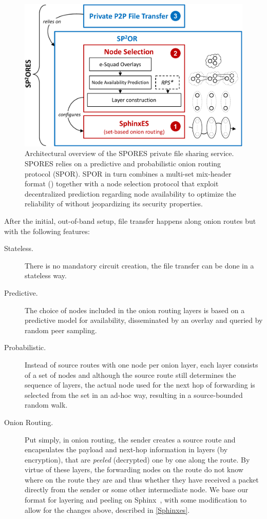 \begin{figure}[t]
  \centering
  \def\svgwidth{0.8\columnwidth}
    \includegraphics[width=\columnwidth]{figures/OverviewSPORES_cropped}
    \caption{Architectural overview of the \ac{SPORES} private file sharing service. \ac{SPORES} relies on a predictive and probabilistic onion routing protocol (\ac{SPOR}). \ac{SPOR} in turn combines a multi-set mix-header format (\Sphinxes) together with a node selection protocol that exploit decentralized prediction regarding node availability to optimize the reliability of \Sphinxes without jeopardizing its security properties.}
    \label{fig:outline}
\end{figure}

After the initial, out-of-band setup, file transfer happens along
onion routes but with the following features:

\begin{description}
\item [Stateless.] There is no mandatory circuit creation, the file transfer can be
  done in a stateless way. 
\item [Predictive.] The choice of nodes included in the onion routing
  layers is based on a predictive model for availability, disseminated
  by an overlay and queried by random peer sampling.
\item [Probabilistic.] Instead of source routes with one node per onion layer, each
  layer consists of a set of nodes and although the source route still
  determines the sequence of layers, the actual node used for the next
  hop of forwarding is selected from the set in an ad-hoc way,
  resulting in a source-bounded random walk.
\item[Onion Routing.] Put simply, in onion routing, the sender creates
  a source route and 
  encapsulates the payload and next-hop information in layers (by
  encryption), that are \emph{peeled} (decrypted) one by one along the
  route. By virtue of these layers, the forwarding nodes on the
  route do not know where on the route they are and thus whether they
  have received a packet directly from the sender or some other
  intermediate node. We base our format for layering and peeling on
  Sphinx~\cite{Sphinx}, with some modification to allow for the
  changes above, described in \cref{Sphinxes}.
\end{description} 

